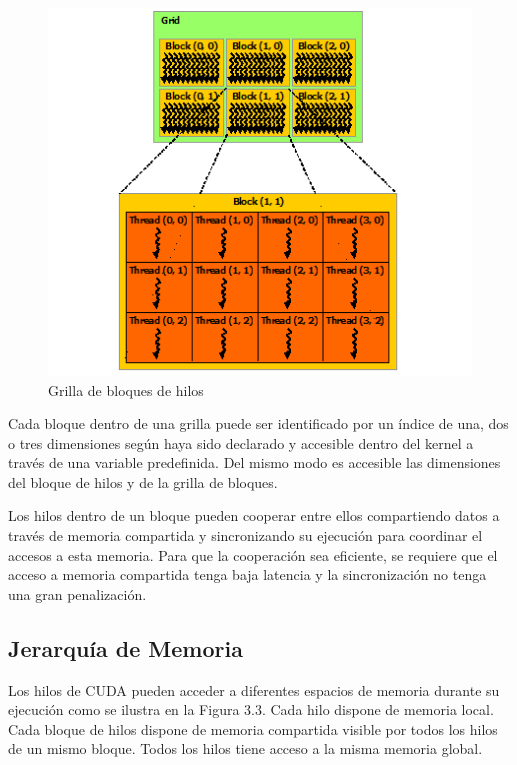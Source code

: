 \documentclass[a4paper,openright,12pt, oneside]{book}
\begin{document}
\begin{figure}[!htbp]
  \begin{center}
    \leavevmode

    \includegraphics[]{grid-of-thread-blocks.png}

    \caption{Grilla de bloques de hilos}
    \label{CUDA}
  \end{center}
\end{figure}

Cada bloque dentro de una grilla puede ser identificado por un \'indice de una,
dos o tres dimensiones seg\'un haya sido declarado y accesible dentro del kernel
a trav\'es de una variable predefinida. Del mismo modo es accesible las dimensiones
del bloque de hilos y de la grilla de bloques. 

Los hilos dentro de un bloque pueden cooperar entre ellos compartiendo datos
a trav\'es de memoria compartida y sincronizando su ejecuci\'on para coordinar el accesos
a esta memoria. Para que la cooperaci\'on sea eficiente, se requiere que el acceso a memoria
compartida tenga baja latencia y la sincronizaci\'on no tenga una gran penalizaci\'on.

\subsection*{Jerarqu\'ia de Memoria}

Los hilos de CUDA pueden acceder a diferentes espacios de memoria durante su ejecuci\'on como
se ilustra en la Figura 3.3. Cada hilo dispone de memoria local. Cada bloque de hilos
dispone de memoria compartida visible por todos los hilos de un mismo bloque. Todos
los hilos tiene acceso a la misma memoria global.
\end{document}
